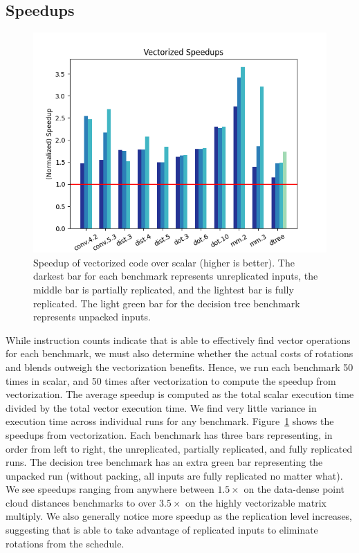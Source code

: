 \subsection{Speedups}\label{sec:speedups}

\begin{figure}
    \includegraphics[width=0.7\linewidth]{figures/graphs/vector_speedups.png}
    \caption{Speedup of vectorized code over scalar (higher is better). The darkest bar for each benchmark represents unreplicated inputs, the middle bar is partially replicated, and the lightest bar is fully replicated. The light green bar for the decision tree benchmark represents unpacked inputs.}\label{fig:vector-speedups}
\end{figure}

While instruction counts indicate that \system is able to effectively find vector operations for each benchmark, we must also determine whether the actual costs of rotations and blends outweigh the vectorization benefits. Hence, we run each benchmark 50 times in scalar, and 50 times after vectorization to compute the speedup from vectorization.
The average speedup is computed as the total scalar execution time divided by the total vector execution time.
We find very little variance in execution time across individual runs for any benchmark.
Figure~\ref{fig:vector-speedups} shows the speedups from vectorization. Each benchmark has three bars representing, in order from left to right, the unreplicated, partially replicated, and fully replicated runs. 
The decision tree benchmark has an extra green bar representing the unpacked run (without packing, all inputs are fully replicated no matter what).
We see speedups ranging from anywhere between $1.5\times$ on the data-dense point cloud distances benchmarks to over $3.5\times$ on the highly vectorizable matrix multiply.
We also generally notice more speedup as the replication level increases, suggesting that \system is able to take advantage of replicated inputs to eliminate rotations from the schedule.

